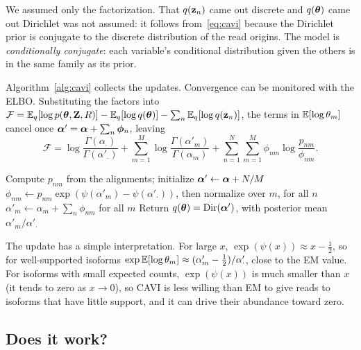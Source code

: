 We assumed only the factorization. That $q(\mathbf{z}_n)$ came out discrete and $q(\boldsymbol{\theta})$ came out Dirichlet was not assumed: it follows from~\eqref{eq:cavi} because the Dirichlet prior is conjugate to the discrete distribution of the read origins. The model is \emph{conditionally conjugate}: each variable's conditional distribution given the others is in the same family as its prior.

Algorithm~\ref{alg:cavi} collects the updates. Convergence can be monitored with the ELBO. Substituting the factors into $\mathcal{F}=\mathbb{E}_q[\log p(\boldsymbol{\theta},\mathbf{Z},R)]-\mathbb{E}_q[\log q(\boldsymbol{\theta})]-\sum_n\mathbb{E}_q[\log q(\mathbf{z}_n)]$, the terms in $\mathbb{E}[\log\theta_m]$ cancel once $\boldsymbol{\alpha}'=\boldsymbol{\alpha}+\sum_n\boldsymbol{\phi}_n$, leaving
\begin{equation}
  \mathcal{F} = \log\frac{\Gamma(\alpha_\cdot)}{\Gamma(\alpha'_\cdot)} + \sum_{m=1}^M\log\frac{\Gamma(\alpha'_m)}{\Gamma(\alpha_m)} + \sum_{n=1}^N\sum_{m=1}^M\phi_{nm}\log\frac{p_{nm}}{\phi_{nm}} .
\end{equation}

\begin{algorithm}[!htbp]
  \caption{CAVI for isoform abundance}
  \label{alg:cavi}
  \begin{algorithmic}[1]
    \State Compute $p_{nm}$ from the alignments; initialize $\boldsymbol{\alpha}'\gets\boldsymbol{\alpha}+N/M$
    \Repeat
      \State $\phi_{nm}\gets p_{nm}\exp(\psi(\alpha'_m)-\psi(\alpha'_\cdot))$, then normalize over $m$, for all $n$
      \State $\alpha'_m\gets\alpha_m+\sum_n\phi_{nm}$ for all $m$
    \State Return $q(\boldsymbol{\theta})=\operatorname{Dir}(\boldsymbol{\alpha}')$, with posterior mean $\alpha'_m/\alpha'_\cdot$
  \end{algorithmic}
\end{algorithm}

The update has a simple interpretation. For large $x$, $\exp(\psi(x))\approx x-\frac12$, so for well-supported isoforms $\exp\mathbb{E}[\log\theta_m]\approx(\alpha'_m-\frac12)/\alpha'_\cdot$, close to the EM value. For isoforms with small expected counts, $\exp(\psi(x))$ is much smaller than $x$ (it tends to zero as $x\to 0$), so CAVI is less willing than EM to give reads to isoforms that have little support, and it can drive their abundance toward zero.

\subsection{Does it work?}

